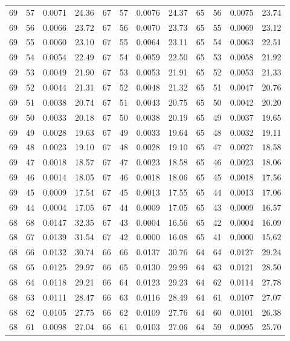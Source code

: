\begin{tabular}{llll|llll|llll}
69 & 57 & 0.0071 & 24.36 & 67 & 57 & 0.0076 & 24.37 & 65 & 56 & 0.0075 & 23.74\\
69 & 56 & 0.0066 & 23.72 & 67 & 56 & 0.0070 & 23.73 & 65 & 55 & 0.0069 & 23.12\\
69 & 55 & 0.0060 & 23.10 & 67 & 55 & 0.0064 & 23.11 & 65 & 54 & 0.0063 & 22.51\\
69 & 54 & 0.0054 & 22.49 & 67 & 54 & 0.0059 & 22.50 & 65 & 53 & 0.0058 & 21.92\\
69 & 53 & 0.0049 & 21.90 & 67 & 53 & 0.0053 & 21.91 & 65 & 52 & 0.0053 & 21.33\\
69 & 52 & 0.0044 & 21.31 & 67 & 52 & 0.0048 & 21.32 & 65 & 51 & 0.0047 & 20.76\\
69 & 51 & 0.0038 & 20.74 & 67 & 51 & 0.0043 & 20.75 & 65 & 50 & 0.0042 & 20.20\\
69 & 50 & 0.0033 & 20.18 & 67 & 50 & 0.0038 & 20.19 & 65 & 49 & 0.0037 & 19.65\\
69 & 49 & 0.0028 & 19.63 & 67 & 49 & 0.0033 & 19.64 & 65 & 48 & 0.0032 & 19.11\\
69 & 48 & 0.0023 & 19.10 & 67 & 48 & 0.0028 & 19.10 & 65 & 47 & 0.0027 & 18.58\\
69 & 47 & 0.0018 & 18.57 & 67 & 47 & 0.0023 & 18.58 & 65 & 46 & 0.0023 & 18.06\\
69 & 46 & 0.0014 & 18.05 & 67 & 46 & 0.0018 & 18.06 & 65 & 45 & 0.0018 & 17.56\\
69 & 45 & 0.0009 & 17.54 & 67 & 45 & 0.0013 & 17.55 & 65 & 44 & 0.0013 & 17.06\\
69 & 44 & 0.0004 & 17.05 & 67 & 44 & 0.0009 & 17.05 & 65 & 43 & 0.0009 & 16.57\\
68 & 68 & 0.0147 & 32.35 & 67 & 43 & 0.0004 & 16.56 & 65 & 42 & 0.0004 & 16.09\\
68 & 67 & 0.0139 & 31.54 & 67 & 42 & 0.0000 & 16.08 & 65 & 41 & 0.0000 & 15.62\\
68 & 66 & 0.0132 & 30.74 & 66 & 66 & 0.0137 & 30.76 & 64 & 64 & 0.0127 & 29.24\\
68 & 65 & 0.0125 & 29.97 & 66 & 65 & 0.0130 & 29.99 & 64 & 63 & 0.0121 & 28.50\\
68 & 64 & 0.0118 & 29.21 & 66 & 64 & 0.0123 & 29.23 & 64 & 62 & 0.0114 & 27.78\\
68 & 63 & 0.0111 & 28.47 & 66 & 63 & 0.0116 & 28.49 & 64 & 61 & 0.0107 & 27.07\\
68 & 62 & 0.0105 & 27.75 & 66 & 62 & 0.0109 & 27.76 & 64 & 60 & 0.0101 & 26.38\\
68 & 61 & 0.0098 & 27.04 & 66 & 61 & 0.0103 & 27.06 & 64 & 59 & 0.0095 & 25.70\\

\end{tabular}
